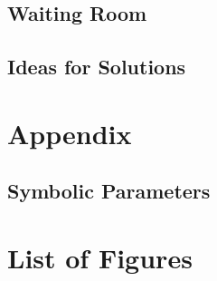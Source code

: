 \documentclass{article}
\begin{document}
		\subsection{Waiting Room}
		\subsection{Ideas for Solutions}
		
	\newpage
	\section*{Appendix}
	\subsection*{Symbolic Parameters}
	
	\newpage
	\section*{List of Figures}		
		
\end{document}
